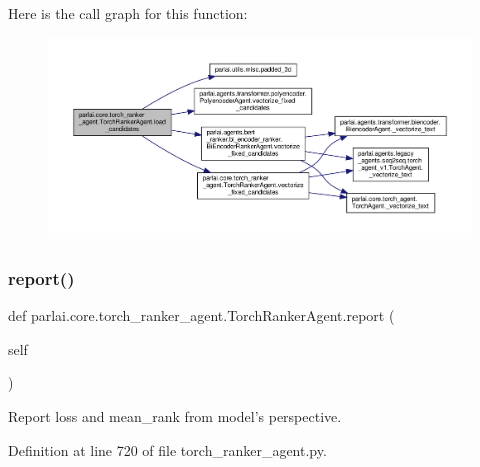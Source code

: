 Here is the call graph for this function\+:
\nopagebreak
\begin{figure}[H]
\begin{center}
\leavevmode
\includegraphics[width=350pt]{classparlai_1_1core_1_1torch__ranker__agent_1_1TorchRankerAgent_a353991d201d8889c453bf72c15ec78a9_cgraph}
\end{center}
\end{figure}
\mbox{\label{classparlai_1_1core_1_1torch__ranker__agent_1_1TorchRankerAgent_a6314748dfa9aaf6e26145af686d5787d}} 
\subsubsection{\texorpdfstring{report()}{report()}}
{\footnotesize\ttfamily def parlai.\+core.\+torch\+\_\+ranker\+\_\+agent.\+Torch\+Ranker\+Agent.\+report (\begin{DoxyParamCaption}\item[{}]{self }\end{DoxyParamCaption})}

\begin{DoxyVerb}Report loss and mean_rank from model's perspective.\end{DoxyVerb}
 

Definition at line 720 of file torch\+\_\+ranker\+\_\+agent.\+py.



